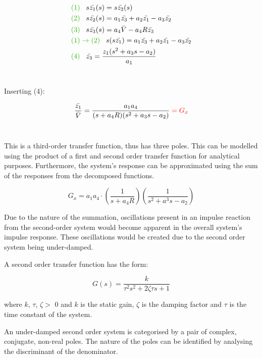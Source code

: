 \documentclass[a4paper,10pt,reqno]{amsart}
\numberwithin{equation}{section}
\begin{document}
\begin{align}
    &\color{darkGreen}(1)\color{black}\;\;\; s\bar{z_1}(s) {}={} s\bar{z_2}(s)
    \\
    &\color{darkGreen}(2)\color{black}\;\;\; s\bar{z_2}(s) {}={} a_1\bar{z_3}+a_2\bar{z_1}-a_3\bar{z_2}
    \\
    &\color{darkGreen}(3)\color{black}\;\;\; s\bar{z_3}(s) {}={} a_4\bar{V}-a_4R\bar{z_3}
    \\
    &\color{darkGreen}(1)\rightarrow(2)\color{black}\;\;\; s(s\bar{z_1}) {}={} a_1\bar{z_3}+a_2\bar{z_1}-a_3\bar{z_2}
    \notag\\
    &\color{darkGreen}(4)\color{black}\;\;\; \bar{z_3} {}={} \frac{z_1(s^2+a_3s-a_2)}{a_1}
    \notag
\end{align}
\\
\par Inserting \color{darkGreen}(4)\color{black}:

\begin{equation}
    \frac{\bar{z_1}}{\bar{V}}=\frac{a_1a_4}{(s+a_4R)(s^2+a_3s-a_2)}\color{red}= G_x\color{black}
\end{equation}
\\

\par This is a third-order transfer function, thus has three poles. This can be modelled using the product of a first and second order transfer function for analytical purposes. Furthermore, the system's response can be approximated using the sum of the responses from the decomposed functions.

\begin{equation}
    G_x = a_1a_4\cdot(\frac{1}{s+a_4R})(\frac{1}{s^2+a^3s-a_2})
\end{equation}

\par Due to the nature of the summation, oscillations present in an impulse reaction from the second-order system would become apparent in the overall system's impulse response. These oscillations would be created due to the second order system being under-damped.
\\
\par A second order transfer function has the form:

\begin{equation}
    G(s) = \frac{k}{\tau^2s^2+2\zeta\tau s+1}
\end{equation}

\par where $k$, $\tau$, $\zeta >$ 0 and $k$ is the static gain, $\zeta$ is the damping factor and $\tau$ is the time constant of the system.
\par An under-damped second order system is categorised by a pair of complex, conjugate, non-real poles. The nature of the poles can be identified by analysing the discriminant of the denominator.
\end{document}
